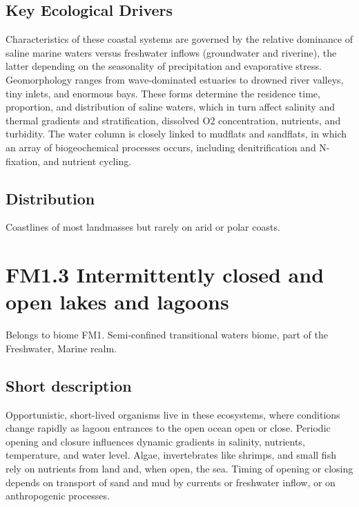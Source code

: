 \documentclass[
  letterpaper,
  DIV=11,
  numbers=noendperiod]{scrartcl}
\begin{document}
\subsection{Key Ecological Drivers}\label{key-ecological-drivers-23}

Characteristics of these coastal systems are governed by the relative
dominance of saline marine waters versus freshwater inflows (groundwater
and riverine), the latter depending on the seasonality of precipitation
and evaporative stress. Geomorphology ranges from wave-dominated
estuaries to drowned river valleys, tiny inlets, and enormous bays.
These forms determine the residence time, proportion, and distribution
of saline waters, which in turn affect salinity and thermal gradients
and stratification, dissolved O2 concentration, nutrients, and
turbidity. The water column is closely linked to mudflats and sandflats,
in which an array of biogeochemical processes occurs, including
denitrification and N-fixation, and nutrient cycling.

\subsection{Distribution}\label{distribution-23}

Coastlines of most landmasses but rarely on arid or polar coasts.

\section{FM1.3 Intermittently closed and open lakes and
lagoons}\label{fm1.3-intermittently-closed-and-open-lakes-and-lagoons}

Belongs to biome FM1. Semi-confined transitional waters biome, part of
the Freshwater, Marine realm.

\subsection{Short description}\label{short-description-24}

Opportunistic, short-lived organisms live in these ecosystems, where
conditions change rapidly as lagoon entrances to the open ocean open or
close. Periodic opening and closure influences dynamic gradients in
salinity, nutrients, temperature, and water level. Algae, invertebrates
like shrimps, and small fish rely on nutrients from land and, when open,
the sea. Timing of opening or closing depends on transport of sand and
mud by currents or freshwater inflow, or on anthropogenic processes.
\end{document}
